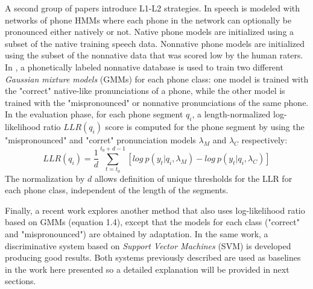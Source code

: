 A second group of papers introduce L1-L2 strategies. In \cite{detection_mispronunciation_instruction}
speech is modeled with networks of phone HMMs where each phone in the network can optionally
be pronounced either natively or not. Native phone models are initialized using a subset of
the native training speech data. Nonnative phone models are initialized using the subset of 
the nonnative data that was scored low by the human raters. 
In \cite{detection_phone_level_mispronunciation_learning}, a phonetically labeled nonnative
database is used to train two different \textit{Gaussian mixture models} (GMMs) for each phone
class: one model is trained with the "correct" native-like pronunciations of a phone, while the
other model is trained with the "mispronounced" or nonnative pronunciations of the same phone.
In the evaluation phase, for each phone segment $q_{i}$, a length-normalized log-likelihood ratio
$LLR(q_{i})$ score is computed for the phone segment by using the "mispronounced" and "corret"
pronunciation models $\lambda_{M}$ and $\lambda_{C}$ respectively:
\begin{equation}
LLR(q_{i}) = \frac{1}{d}\sum_{t=t_{0}}^{t_{0}+d-1} [log \ p(y_{t}|q_{i}, \lambda_{M}) - log \ p(y_{t}|q_{i}, \lambda_{C})]
\end{equation}
The normalization by $d$ allows definition of unique thresholds for the LLR for each phone class, 
independent of the length of the segments.

Finally, a recent work \cite{main} explores another method that also uses 
log-likelihood ratio based on  GMMs (equation 1.4), except that the models for each 
class ("correct" and  "mispronounced") are obtained by adaptation. In the same work, 
a discriminative system based
on \textit{Support Vector Machines} (SVM) is developed producing good results. Both systems
previously described are used as baselines in the work here presented so a detailed explanation
will be provided in next sections.